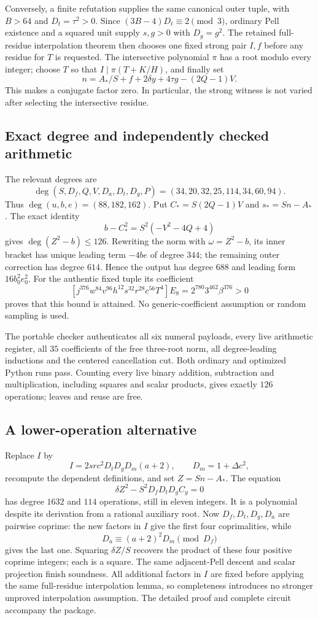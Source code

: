 Conversely, a finite refutation supplies the same canonical outer tuple,
with $B>64$ and $D_t=\tau^2>0$. Since $(3B-4)D_t\equiv2\pmod3$,
ordinary Pell existence and a squared unit supply $s,g>0$ with
$D_g=g^2$. The retained full-residue interpolation theorem then chooses
one fixed strong pair $I,f$ before any residue for $T$ is requested.
The intersective polynomial $\pi$ has a root modulo every integer;
choose $T$ so that $I\mid\pi(T+K/H)$, and finally set
\[
 n=A_*/S+f+2\delta y+4\tau g-(2Q-1)V.
\]
This makes a conjugate factor zero. In particular, the strong witness is
not varied after selecting the intersective residue.

\subsection{Exact degree and independently checked arithmetic}
The relevant degrees are
\[
 \deg(S,D_f,Q,V,D_a,D_t,D_g,P)=(34,20,32,25,114,34,60,94).
\]
Thus $\deg(u,b,e)=(88,182,162)$. Put $C_*=S(2Q-1)V$ and
$s_*=Sn-A_*$. The exact identity
\[
 b-C_*^2=S^2(-V^2-4Q+4)
\]
gives $\deg(Z^2-b)\le126$. Rewriting the norm with
$\omega=Z^2-b$, its inner bracket has unique leading term $-4be$
of degree $344$; the remaining outer correction has degree $614$.
Hence the output has degree $688$ and leading form $16b_0^2e_0^2$.
For the authentic fixed tuple its coefficient
\[
 [j^{376}w^{84}v^{96}h^{12}s^{32}r^{28}c^{56}T^4]E_8
       =2^{780}3^{462}\beta^{376}>0
\]
proves that this bound is attained. No generic-coefficient assumption or
random sampling is used.

The portable checker authenticates all six numeral payloads, every live
arithmetic register, all $35$ coefficients of the free three-root norm,
all degree-leading inductions and the centered cancellation cut.
Both ordinary and optimized Python runs pass. Counting every live binary
addition, subtraction and multiplication, including squares and scalar
products, gives exactly $126$ operations; leaves and reuse are free.

\subsection{A lower-operation alternative}
Replace $I$ by
\[
 I=2src^2D_tD_gD_m(a+2),\qquad D_m=1+\Delta c^2,
\]
recompute the dependent definitions, and set $Z=Sn-A_*$. The equation
\[
 \boxed{\ \delta Z^2-S^2D_fD_tD_gC_y=0\ }
\]
has degree $1632$ and $114$ operations, still in eleven integers.
It is a polynomial despite its derivation from a rational auxiliary root.
Now $D_f,D_t,D_g,D_a$ are pairwise coprime: the new factors in $I$
give the first four coprimalities, while
\[
 D_a\equiv(a+2)^2D_m\pmod {D_f}
\]
gives the last one. Squaring $\delta Z/S$ recovers the product of these
four positive coprime integers; each is a square. The same adjacent-Pell
descent and scalar projection finish soundness. All additional factors
in $I$ are fixed before applying the same full-residue interpolation
lemma, so completeness introduces no stronger unproved interpolation
assumption. The detailed proof and complete circuit accompany the package.
